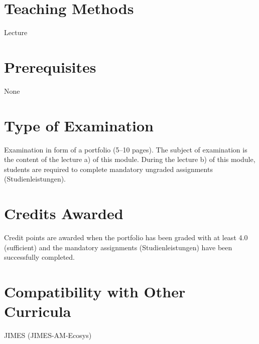 \documentclass[
  letterpaper,
  10pt,
  openany]{book}
\begin{document}
\section*{Teaching Methods}\label{teaching-methods-3}


Lecture

\section*{Prerequisites}\label{prerequisites-3}


None

\section*{Type of Examination}\label{type-of-examination-3}


Examination in form of a portfolio (5--10 pages). The subject of
examination is the content of the lecture a) of this module. During the
lecture b) of this module, students are required to complete mandatory
ungraded assignments (Studienleistungen).

\section*{Credits Awarded}\label{credits-awarded-3}


Credit points are awarded when the portfolio has been graded with at
least 4.0 (sufficient) and the mandatory assignments (Studienleistungen)
have been successfully completed.

\section*{Compatibility with Other
Curricula}\label{compatibility-with-other-curricula-3}


JIMES (JIMES-AM-Ecosys)
\end{document}
